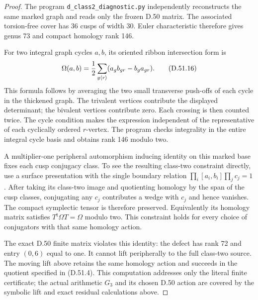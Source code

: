 \begin{proof}
The program \texttt{d\_class2\_diagnostic.py}
independently reconstructs the same marked
graph and reads only the frozen D.50 matrix.
The associated torsion-free cover has
36 cusps of width 30. Euler characteristic
therefore gives genus 73 and compact homology
rank 146.

For two integral graph cycles \(a,b\), its
oriented ribbon intersection form is
\[
       \Omega(a,b)
          ={1\over2}\sum_{g\langle r\rangle}
                   (a_g b_{gr}-b_g a_{gr}).
 \tag{D.51.16}
\]
This formula follows by averaging the two
small transverse push-offs of each cycle
in the thickened graph. The trivalent
vertices contribute the displayed
determinant; the bivalent vertices contribute
zero. Each crossing is then counted twice.
The cycle condition makes the expression
independent of the representative of each
cyclically ordered \(r\)-vertex. The program
checks integrality in the entire integral
cycle basis and obtains rank 146 modulo two.

A multiplier-one peripheral automorphism
inducing identity on this marked base fixes
each cusp conjugacy class. To see the
resulting class-two constraint directly,
use a surface presentation with the single
boundary relation
\(\prod_i[a_i,b_i]\prod_jc_j=1\).
After taking its class-two image and
quotienting homology by the span of the
cusp classes, conjugating any \(c_j\)
contributes a wedge with \(c_j\) and hence
vanishes. The compact symplectic tensor is
therefore preserved. Equivalently its
homology matrix satisfies
\(T^{\mathsf t}\Omega T=\Omega\) modulo two.
This constraint holds for every choice of
conjugators with that same homology action.

The exact D.50 finite matrix violates this
identity: the defect has rank 72 and entry
\((0,6)\) equal to one. It cannot lift
peripherally to the full class-two source.
The moving lift above retains the same
homology action and succeeds in the quotient
specified in (D.51.4). This computation
addresses only the literal finite certificate;
the actual arithmetic \(G_3\) and its chosen
D.50 action are covered by the symbolic
lift and exact residual calculations above.
\end{proof}
